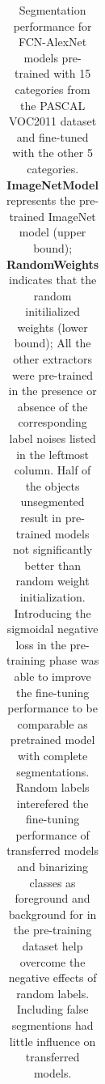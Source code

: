 \begin{table}[t]
{\begin{tabular}{l|l|llll|l}
\end{tabular}
}
\caption{Segmentation performance for FCN-AlexNet models pre-trained with 15 categories from the PASCAL VOC2011 dataset and fine-tuned with the other 5 categories.
\textbf{ImageNetModel} represents the pre-trained ImageNet model (upper bound);
\textbf{RandomWeights} indicates that the random initilialized weights (lower bound);
All the other extractors were pre-trained in the presence or absence of the corresponding label noises listed in the leftmost column.
Half of the objects unsegmented result in pre-trained models not significantly better than random weight initialization.
Introducing the sigmoidal negative loss in the pre-training phase was able to improve the fine-tuning performance to be comparable as pretrained model with complete segmentations.
Random labels interefered the fine-tuning performance of transferred models and binarizing classes as foreground and background for in the pre-training dataset help overcome the negative effects of random labels.
Including false segmentions had little influence on transferred models.
}
\label{tab:robustness}
\end{table}


